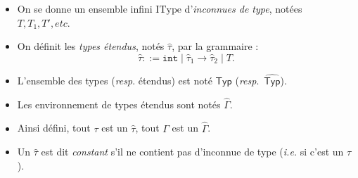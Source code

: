 \documentclass[../main]{subfiles}
\begin{document}
  \begin{defn}
    \begin{itemize}
      \item On se donne un ensemble infini $\mathrm{IType}$ d'\textit{inconnues de type}, notées $T, T_1, T', \textit{etc}$.
      \item On définit les \textit{types étendus}, notés $\hat{\tau}$, par la grammaire : \[
          \hat{\tau} ::= \mathtt{int}  \mid \hat{\tau}_1 \to \hat{\tau}_2  \mid T
        .\]
      \item L'ensemble des types (\textit{resp}. étendus) est noté $\mathsf{Typ}$ (\textit{resp}.~$\widehat{\mathsf{Typ}}$).
      \item Les environnement de types étendus sont notés $\widehat{\Gamma}$.
      \item Ainsi défini, tout $\tau$ est un  $\hat{\tau}$, tout $\Gamma$ est un $\widehat{\Gamma}$.
      \item Un $\hat{\tau}$ est dit \textit{constant} s'il ne contient pas d'inconnue de type (\textit{i.e.} si c'est un $\tau$).
    \end{itemize}
  \end{defn}
\end{document}

